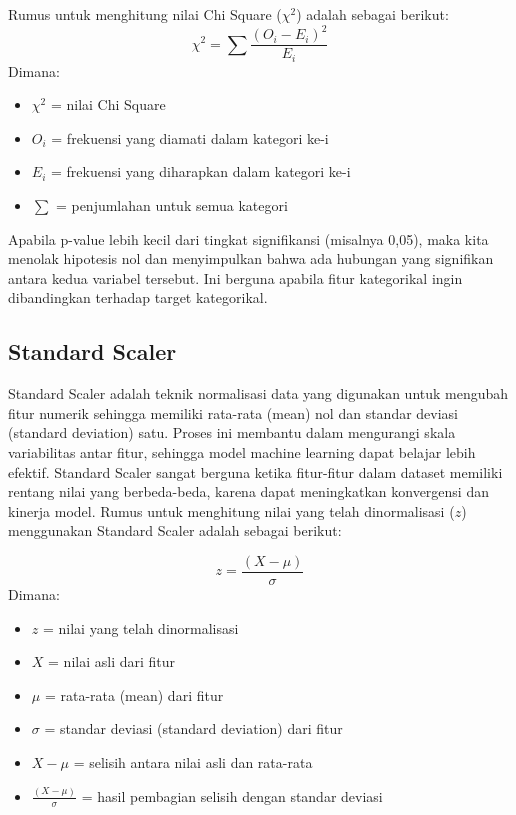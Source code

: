 Rumus untuk menghitung nilai Chi Square ($\chi^2$) adalah sebagai berikut:
\begin{equation}
    \chi^2 = \sum \frac{(O_i - E_i)^2}{E_i}
\end{equation}
Dimana:
\begin{itemize}
    \item $\chi^2$ = nilai Chi Square
    \item $O_i$ = frekuensi yang diamati dalam kategori ke-i
    \item $E_i$ = frekuensi yang diharapkan dalam kategori ke-i
    \item $\sum$ = penjumlahan untuk semua kategori
\end{itemize}

Apabila p-value lebih kecil dari tingkat signifikansi (misalnya 0,05), maka kita menolak hipotesis nol dan menyimpulkan bahwa ada hubungan yang signifikan antara kedua variabel tersebut. Ini berguna apabila fitur kategorikal ingin dibandingkan terhadap target kategorikal.

\subsection{Standard Scaler}
Standard Scaler adalah teknik normalisasi data yang digunakan untuk mengubah fitur numerik sehingga memiliki rata-rata (mean) nol dan standar deviasi (standard deviation) satu. Proses ini membantu dalam mengurangi skala variabilitas antar fitur, sehingga model machine learning dapat belajar lebih efektif. Standard Scaler sangat berguna ketika fitur-fitur dalam dataset memiliki rentang nilai yang berbeda-beda, karena dapat meningkatkan konvergensi dan kinerja model. \parencite{jain2016feature}
Rumus untuk menghitung nilai yang telah dinormalisasi ($z$) menggunakan Standard Scaler adalah sebagai berikut:

\begin{equation}
    z = \frac{(X - \mu)}{\sigma}
\end{equation}
Dimana:
\begin{itemize}
    \item $z$ = nilai yang telah dinormalisasi
    \item $X$ = nilai asli dari fitur
    \item $\mu$ = rata-rata (mean) dari fitur
    \item $\sigma$ = standar deviasi (standard deviation) dari fitur
    \item $X - \mu$ = selisih antara nilai asli dan rata-rata
    \item $\frac{(X - \mu)}{\sigma}$ = hasil pembagian selisih dengan standar deviasi
\end{itemize}

